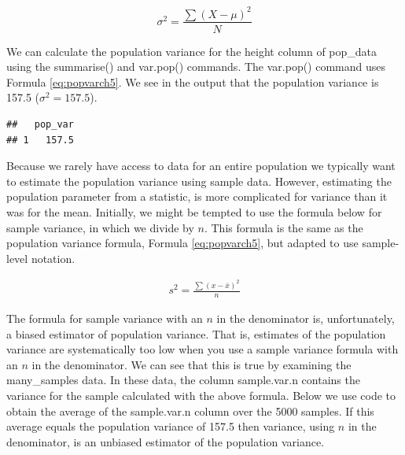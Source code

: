 \documentclass[
]{krantz}
\makeatletter
\newenvironment{Shaded}{\begin{snugshade}}{\end{snugshade}}
\newcommand{\DataTypeTok}[1]{\textcolor[rgb]{0.27,0.27,0.27}{#1}}
\newcommand{\KeywordTok}[1]{\textcolor[rgb]{0.27,0.27,0.27}{\textbf{#1}}}
\newcommand{\NormalTok}[1]{#1}
\newcommand{\OperatorTok}[1]{\textcolor[rgb]{0.43,0.43,0.43}{\textbf{#1}}}
\newcommand{\StringTok}[1]{\textcolor[rgb]{0.5,0.5,0.5}{#1}}
\newenvironment{kframe}{%
\medskip{}
\setlength{\fboxsep}{.8em}
 \def\at@end@of@kframe{}%
 \ifinner\ifhmode%
  \def\at@end@of@kframe{\end{minipage}}%
  \begin{minipage}{\columnwidth}%
 \fi\fi%
 \def\FrameCommand##1{\hskip\@totalleftmargin \hskip-\fboxsep
 \colorbox{shadecolor}{##1}\hskip-\fboxsep
     \hskip-\linewidth \hskip-\@totalleftmargin \hskip\columnwidth}%
 \MakeFramed {\advance\hsize-\width
   \@totalleftmargin\z@ \linewidth\hsize
   \@setminipage}}%
 {\par\unskip\endMakeFramed%
 \at@end@of@kframe}
\renewenvironment{Shaded}{\begin{kframe}}{\end{kframe}}
\makeatother
\begin{document}
\begin{equation} 
\sigma^2 = \frac{\sum{(X - \mu)^2}}{N}
      \label{eq:popvarch5}
\end{equation}

We can calculate the population variance for the height column of pop\_data using the summarise() and var.pop() commands. The var.pop() command uses Formula \eqref{eq:popvarch5}. We see in the output that the population variance is 157.5 (\(\sigma^2 = 157.5\)).

\begin{Shaded}
\end{Shaded}

\begin{verbatim}
##   pop_var
## 1   157.5
\end{verbatim}

Because we rarely have access to data for an entire population we typically want to estimate the population variance using sample data. However, estimating the population parameter from a statistic, is more complicated for variance than it was for the mean. Initially, we might be tempted to use the formula below for sample variance, in which we divide by \(n\). This formula is the same as the population variance formula, Formula \eqref{eq:popvarch5}, but adapted to use sample-level notation.

\[
\begin{aligned} 
s^2 = \frac{\sum{(x - \bar{x})^2}}{n}
\end{aligned} 
\]

The formula for sample variance with an \(n\) in the denominator is, unfortunately, a biased estimator of population variance. That is, estimates of the population variance are systematically too low when you use a sample variance formula with an \(n\) in the denominator. We can see that this is true by examining the many\_samples data. In these data, the column sample.var.n contains the variance for the sample calculated with the above formula. Below we use code to obtain the average of the sample.var.n column over the 5000 samples. If this average equals the population variance of 157.5 then variance, using \(n\) in the denominator, is an unbiased estimator of the population variance.
\end{document}

